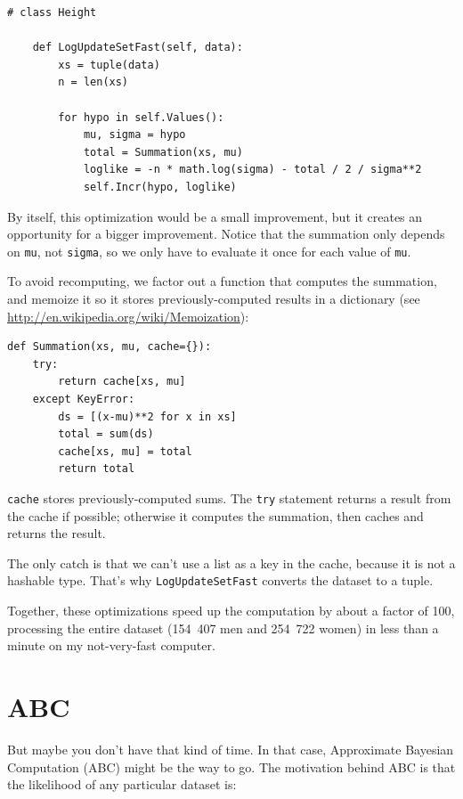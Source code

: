 \documentclass[12pt]{book}
\begin{document}
\begin{verbatim}
# class Height

    def LogUpdateSetFast(self, data):
        xs = tuple(data)
        n = len(xs)

        for hypo in self.Values():
            mu, sigma = hypo
            total = Summation(xs, mu)
            loglike = -n * math.log(sigma) - total / 2 / sigma**2
            self.Incr(hypo, loglike)
\end{verbatim}

By itself, this optimization would be a small improvement, but it
creates an opportunity for a bigger improvement.  Notice that the
summation only depends on {\tt mu}, not {\tt sigma}, so we only
have to evaluate it once for each value of {\tt mu}.

To avoid recomputing, we factor out a function that computes
the summation, and memoize it so it stores previously-computed
results in a dictionary (see \url{http://en.wikipedia.org/wiki/Memoization}):

\begin{verbatim}
def Summation(xs, mu, cache={}):
    try:
        return cache[xs, mu]
    except KeyError:
        ds = [(x-mu)**2 for x in xs]
        total = sum(ds)
        cache[xs, mu] = total
        return total
\end{verbatim}

{\tt cache} stores previously-computed sums.  The {\tt try} statement
returns a result from the cache if possible; otherwise it computes
the summation, then caches and returns the result.

The only catch is that we can't use a list as a key in the cache, because
it is not a hashable type.  That's why {\tt LogUpdateSetFast} converts
the dataset to a tuple.

Together, these optimizations speed up the computation by about a
factor of 100, processing the entire dataset (154~407 men and 254~722
women) in less than a minute on my not-very-fast computer.


\section{ABC}

But maybe you don't have that kind of time.  In that case, Approximate
Bayesian Computation (ABC) might be the way to go.  The motivation
behind ABC is that the likelihood of any particular dataset is:
\end{document}
